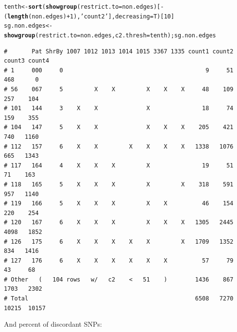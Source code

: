 \documentclass{article}\usepackage[]{graphicx}\usepackage[]{color}
\makeatletter
\newcommand{\hlnum}[1]{\textcolor[rgb]{0.686,0.059,0.569}{#1}}%
\newcommand{\hlstr}[1]{\textcolor[rgb]{0.192,0.494,0.8}{#1}}%
\newcommand{\hlopt}[1]{\textcolor[rgb]{0,0,0}{#1}}%
\newcommand{\hlstd}[1]{\textcolor[rgb]{0.345,0.345,0.345}{#1}}%
\newcommand{\hlkwb}[1]{\textcolor[rgb]{0.69,0.353,0.396}{#1}}%
\newcommand{\hlkwc}[1]{\textcolor[rgb]{0.333,0.667,0.333}{#1}}%
\newcommand{\hlkwd}[1]{\textcolor[rgb]{0.737,0.353,0.396}{\textbf{#1}}}%
\newenvironment{kframe}{%
 \def\at@end@of@kframe{}%
 \ifinner\ifhmode%
  \def\at@end@of@kframe{\end{minipage}}%
  \begin{minipage}{\columnwidth}%
 \fi\fi%
 \def\FrameCommand##1{\hskip\@totalleftmargin \hskip-\fboxsep
 \colorbox{shadecolor}{##1}\hskip-\fboxsep
     \hskip-\linewidth \hskip-\@totalleftmargin \hskip\columnwidth}%
 \MakeFramed {\advance\hsize-\width
   \@totalleftmargin\z@ \linewidth\hsize
   \@setminipage}}%
 {\par\unskip\endMakeFramed%
 \at@end@of@kframe}
\newenvironment{knitrout}{}{} %
\makeatother
\begin{document}
\begin{knitrout}\scriptsize
{}\color{fgcolor}\begin{kframe}
\begin{alltt}
\hlstd{tenth} \hlkwb{<-} \hlkwd{sort}\hlstd{(}\hlkwd{showgroup}\hlstd{(}\hlkwc{restrict.to}\hlstd{=non.edges)[}\hlopt{-}\hlstd{(}\hlkwd{length}\hlstd{(non.edges)}\hlopt{+}\hlnum{1}\hlstd{),}\hlstr{'count2'}\hlstd{],}\hlkwc{decreasing}\hlstd{=T)[}\hlnum{10}\hlstd{]}
\hlstd{sg.non.edges} \hlkwb{<-} \hlkwd{showgroup}\hlstd{(}\hlkwc{restrict.to}\hlstd{=non.edges,} \hlkwc{c2.thresh} \hlstd{= tenth) ; sg.non.edges}
\end{alltt}
\begin{verbatim}
#       Pat ShrBy 1007 1012 1013 1014 1015 3367 1335 count1 count2 count3 count4
# 1     000     0                                         9     51    468      0
# 56    067     5         X    X         X    X    X     48    109    257    104
# 101   144     3    X    X              X               18     74    159    355
# 104   147     5    X    X              X    X    X    205    421    740   1160
# 112   157     6    X    X         X    X    X    X   1338   1076    665   1343
# 117   164     4    X    X    X         X               19     51     71    163
# 118   165     5    X    X    X         X         X    318    591    957   1140
# 119   166     5    X    X    X         X    X          46    154    220    254
# 120   167     6    X    X    X         X    X    X   1305   2445   4098   1852
# 126   175     6    X    X    X    X    X         X   1709   1352    834   1416
# 127   176     6    X    X    X    X    X    X          57     79     43     68
# Other   (   104 rows   w/   c2    <   51    )        1436    867   1703   2302
# Total                                                6508   7270  10215  10157
\end{verbatim}
\end{kframe}
\end{knitrout}

And percent of discordant SNPs:
\end{document}
